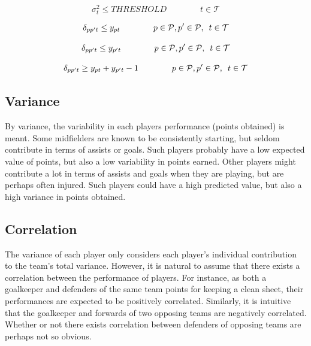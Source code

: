\begin{equation}
    \sigma^2_{t} \leq THRESHOLD \qquad\qquad t \in \mathcal{T}
\end{equation}

\begin{equation}
    \delta_{pp't} \leq y_{pt}  \qquad\qquad p \in \mathcal{P}, p' \in \mathcal{P}, \enskip t \in \mathcal{T}
\end{equation}

\begin{equation}
    \delta_{pp't} \leq y_{p't}  \qquad\qquad p \in \mathcal{P}, p' \in \mathcal{P}, \enskip t \in \mathcal{T}
\end{equation}

\begin{equation}
    \delta_{pp't} \geq y_{pt} + y_{p't} - 1  \qquad\qquad p \in \mathcal{P}, p' \in \mathcal{P}, \enskip t \in \mathcal{T}
\end{equation}



\subsection{Variance}
By variance, the variability in each players performance (points obtained) is meant. Some midfielders are known to be consistently starting, but seldom contribute in terms of assists or goals. Such players probably have a low expected value of points, but also a low variability in points earned. Other players might contribute a lot in terms of assists and goals when they are playing, but are perhaps often injured. Such players could have a high predicted value, but also a high variance in points obtained.\newpar

\subsection{Correlation}
The variance of each player only considers each player's individual contribution to the team's total variance. However, it is natural to assume that there exists a correlation between the performance of players. For instance, as both a goalkeeper and defenders of the same team points for keeping a clean sheet, their performances are expected to be positively correlated. Similarly, it is intuitive that the goalkeeper and forwards of two opposing teams are negatively correlated. Whether or not there exists correlation between defenders of opposing teams are perhaps not so obvious. \newpar

